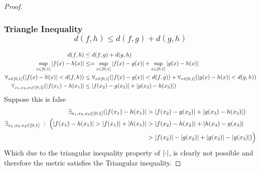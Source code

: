 \documentclass[]{article}
\newcommand{\st}{\ : \ }
\begin{document}
\begin{proof}
    \subsubsection{Triangle Inequality \[d(f,h) \leq d(f,g) + d(g,h)\]}
    \begin{align*}
        d(f,h) &\leq d(f,g) + d(g,h)\\
        \sup_{x \in [0,1]} \abs{f(x) - h(x)} 
            &\leq  = \sup_{x \in [0,1]} \abs{f(x) - g(x)} + \sup_{x \in [0,1]} \abs{g(x) - h(x)}\\
        \forall_{x \in [0,1]} \qty(\abs{f(x) - h(x)} < d(f,h))
            &\leq \forall_{x \in [0,1]} \qty(\abs{f(x) - g(x)} < d(f,g)) + \forall_{x \in [0,1]} \qty(\abs{g(x) - h(x)} < d(g,h))\\
        \forall_{x_1,x_2,x_3 \in [0,1]} (\abs{f(x_1) - h(x_1)}
            & \leq \abs{f(x_2) - g(x_2)} + \abs{g(x_3) - h(x_3)})
    \end{align*}
    Suppose this is false
    \begin{align*}
        \exists_{x_1,x_2,x_3 \in [0,1]} (\abs{f(x_1) - h(x_1)}
        & > \abs{f(x_2) - g(x_2)} + \abs{g(x_3) - h(x_3)})\\
        \exists_{x_1,x_2,x_3 \in [0,1]} \st \Big(\abs{f(x_1) - h(x_1)} 
        > \abs{f(x_1)} + \abs{h(x_1)}
        &> \abs{f(x_2) - h(x_2)} + \abs{h(x_3) - g(x_3)}\\
        &> \abs{f(x_2)} - \abs{g(x_2)} + \abs{g(x_3)} - \abs{g(x_3)})\Big)\\
    \end{align*}
    Which due to the triangular inequality property of $\abs{\cdot}$, is clearly not possible and therefore the metric satisfies the Triangular inequality.
\end{proof}

\newpage
\end{document}
